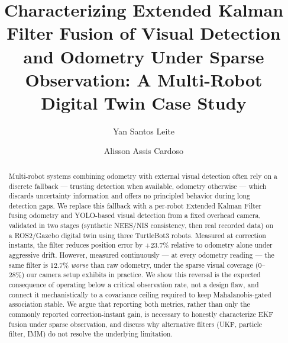 \documentclass[runningheads]{llncs}
\begin{document}
\title{Characterizing Extended Kalman Filter Fusion of Visual Detection and Odometry Under Sparse Observation: A Multi-Robot Digital Twin Case Study}


\author{Yan Santos Leite \and Alisson Assis Cardoso}



\maketitle

\begin{abstract}
Multi-robot systems combining odometry with external visual detection
often rely on a discrete fallback — trusting detection when available,
odometry otherwise — which discards uncertainty information and offers
no principled behavior during long detection gaps. We replace this
fallback with a per-robot Extended Kalman Filter fusing odometry and
YOLO-based visual detection from a fixed overhead camera, validated in
two stages (synthetic NEES/NIS consistency, then real recorded data) on
a ROS2/Gazebo digital twin using three TurtleBot3 robots. Measured at
correction instants, the filter reduces position error by $+23.7\%$
relative to odometry alone under aggressive drift. However, measured
continuously — at every odometry reading — the same filter is $12.7\%$
\emph{worse} than raw odometry, under the sparse visual coverage
(0--28\%) our camera setup exhibits in practice. We show this reversal
is the expected consequence of operating below a critical observation
rate, not a design flaw, and connect it mechanistically to a covariance
ceiling required to keep Mahalanobis-gated association stable. We argue
that reporting both metrics, rather than only the commonly reported
correction-instant gain, is necessary to honestly characterize EKF
fusion under sparse observation, and discuss why alternative filters
(UKF, particle filter, IMM) do not resolve the underlying limitation.

\end{abstract}
\end{document}
